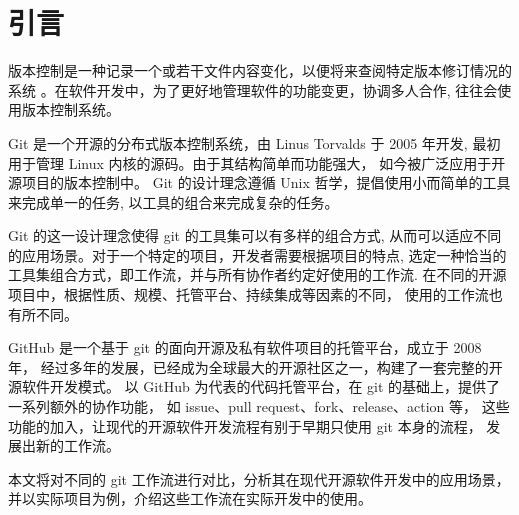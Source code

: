 \documentclass[../main.tex]{subfiles}
\begin{document}
\section{引言}

版本控制是一种记录一个或若干文件内容变化，以便将来查阅特定版本修订情况的系统
\cite{progit}。在软件开发中，为了更好地管理软件的功能变更，协调多人合作,
往往会使用版本控制系统。

Git 是一个开源的分布式版本控制系统，由 Linus Torvalds 于 2005 年开发,
最初用于管理 Linux 内核的源码。由于其结构简单而功能强大，
如今被广泛应用于开源项目的版本控制中。
Git 的设计理念遵循 Unix 哲学，提倡使用小而简单的工具来完成单一的任务,
以工具的组合来完成复杂的任务。

Git 的这一设计理念使得 git 的工具集可以有多样的组合方式,
从而可以适应不同的应用场景。对于一个特定的项目，开发者需要根据项目的特点,
选定一种恰当的工具集组合方式，即工作流，并与所有协作者约定好使用的工作流.
在不同的开源项目中，根据性质、规模、托管平台、持续集成等因素的不同，
使用的工作流也有所不同。

GitHub 是一个基于 git 的面向开源及私有软件项目的托管平台，成立于 2008 年，
经过多年的发展，已经成为全球最大的开源社区之一，构建了一套完整的开源软件开发模式。
以 GitHub 为代表的代码托管平台，在 git 的基础上，提供了一系列额外的协作功能，
如 issue、pull request、fork、release、action 等，
这些功能的加入，让现代的开源软件开发流程有别于早期只使用 git 本身的流程，
发展出新的工作流。

本文将对不同的 git 工作流进行对比，分析其在现代开源软件开发中的应用场景，
并以实际项目为例，介绍这些工作流在实际开发中的使用。
\end{document}
